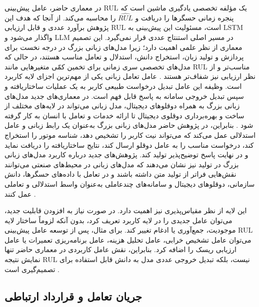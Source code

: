 در معماری حاضر، عامل پیش‌بینی \gls{RUL} یک مؤلفه تخصصی یادگیری ماشین است که پنجره زمانی حسگرها را دریافت و $\widehat{RUL}$ را محاسبه می‌کند. از آنجا که هدف این پژوهش برآورد عددی و قابل ارزیابی \gls{RUL} است، مسئولیت این پیش‌بینی به LSTM واگذار می‌شود و LLM در مسیر اصلی استنتاج عددی قرار نمی‌گیرد. این تصمیم معماری از نظر علمی اهمیت دارد؛ زیرا مدل‌های زبانی بزرگ در درجه نخست برای پردازش و تولید زبان، استخراج دانش، استدلال و تعامل مناسب هستند، در حالی که مدل‌های تخصصی سری زمانی برای تخمین کمّی متغیرهایی مانند \gls{RUL} مناسب‌تر و از نظر ارزیابی نیز شفاف‌تر هستند \cite{lkgstnet2026}. عامل تعامل زبانی یکی از مهم‌ترین اجزای لایه کاربرد است. وظیفه این عامل تبدیل درخواست طبیعی کاربر به یک عملیات ساختاریافته و سپس تبدیل خروجی سامانه به پاسخ قابل فهم است. در معماری‌های جدید مدل‌های زبانی بزرگ به همراه دوقلو‌های دیجیتال، مدل زبانی می‌تواند در لایه‌های مختلف از ساخت و بهره‌برداری دوقلوی دیجیتال تا ارائه خدمات و تعامل با انسان به کار گرفته شود \cite{CHEN2025102982LLMDT,zhou2026dtai}. بنابراین، در پژوهش حاضر مدل‌های زبانی بزرگ به‌عنوان یک رابط زبانی و عامل استدلالی عمل می‌کند که می‌تواند نیت کاربر را تشخیص دهد، شناسه موتور را استخراج کند، درخواست مناسب را به عامل دوقلو ارسال کند، نتایج ساختاریافته را دریافت نماید و در نهایت پاسخ توضیح‌پذیر تولید کند. پژوهش‌های جدید درباره کاربرد مدل‌های زبانی بزرگ در تولید نیز نشان می‌دهند که مدل‌های زبانی در محیط‌های صنعتی می‌توانند نقش‌هایی فراتر از تولید متن داشته باشند و در تعامل با داده‌های حسگرها، دانش سازمانی، دوقلو‌های دیجیتال و سامانه‌های چندعاملی به‌عنوان واسط استدلالی و تعاملی عمل کنند \cite{maghanaki2026llmmanufacturing}.

این لایه از نظر مقیاس‌پذیری نیز اهمیت دارد. در صورت نیاز به افزودن قابلیت جدید، می‌توان عامل جدیدی را در لایه کاربرد تعریف کرد، بدون آنکه لزوماً ساختار لایه موجودیت، جمع‌آوری یا ادغام تغییر کند. برای مثال، پس از توسعه عامل پیش‌بینی \gls{RUL} می‌توان عامل تشخیص خرابی، عامل تحلیل هزینه، عامل برنامه‌ریزی تعمیرات یا عامل ارزیابی ریسک را اضافه کرد. بنابراین، نقش عامل کاربردی در معماری حاضر تنها نمایش نتیجه \gls{RUL} نیست، بلکه تبدیل خروجی عددی مدل به دانش قابل استفاده برای تصمیم‌گیری است \cite{xagentmaint2026}.


\subsection{جریان تعامل و قرارداد ارتباطی}
\label{sec:arch-interaction}

